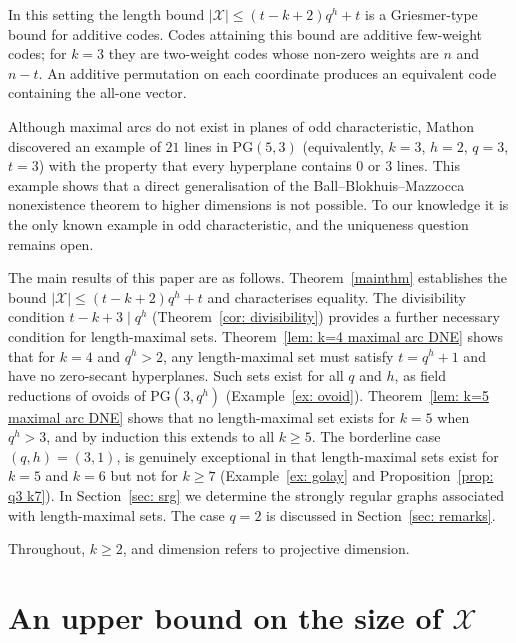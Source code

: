 \documentclass[12pt, twoside]{article}
\begin{document}
	In this setting the length bound $|\mathcal{X}| \leq (t-k+2)q^h+t$ is a Griesmer-type bound for additive codes. Codes attaining this bound are additive few-weight codes; for $k=3$ they are two-weight codes whose non-zero weights are $n$ and $n-t$. An additive permutation on each coordinate produces an equivalent code containing the all-one vector.
	
	Although maximal arcs do not exist in planes of odd characteristic, Mathon \cite{DDHM2002} discovered an example of $21$ lines in $\mathrm{PG}(5,3)$ (equivalently, $k=3$, $h=2$, $q=3$, $t=3$) with the property that every hyperplane contains $0$ or $3$ lines. This example shows that a direct generalisation of the Ball--Blokhuis--Mazzocca nonexistence theorem to higher dimensions is not possible. To our knowledge it is the only known example in odd characteristic, and the uniqueness question remains open.
	
	The main results of this paper are as follows. Theorem~\ref{mainthm} establishes the bound $|\mathcal{X}| \leq (t-k+2)q^h+t$ and characterises equality. The divisibility condition $t-k+3 \mid q^h$ (Theorem~\ref{cor: divisibility}) provides a further necessary condition for length-maximal sets. Theorem~\ref{lem: k=4 maximal arc DNE} shows that for $k=4$ and $q^h>2$, any length-maximal set must satisfy $t=q^h+1$ and have no zero-secant hyperplanes. Such sets exist for all $q$ and $h$, as field reductions of ovoids of $\mathrm{PG}(3,q^h)$ (Example~\ref{ex: ovoid}). Theorem~\ref{lem: k=5 maximal arc DNE} shows that no length-maximal set exists for $k=5$ when $q^h>3$, and by induction this extends to all $k \ge 5$. The borderline case $(q,h)=(3,1)$, is genuinely exceptional in that length-maximal sets exist for $k=5$ and $k=6$ but not for $k\ge7$ (Example~\ref{ex: golay} and Proposition~\ref{prop: q3 k7}). In Section~\ref{sec: srg} we determine the strongly regular graphs associated with length-maximal sets. The case $q=2$ is discussed in Section~\ref{sec: remarks}.
	
	Throughout, $k \ge 2$, and dimension refers to projective dimension.
	
	\section{An upper bound on the size of $\mathcal{X}$}
	
\end{document}

